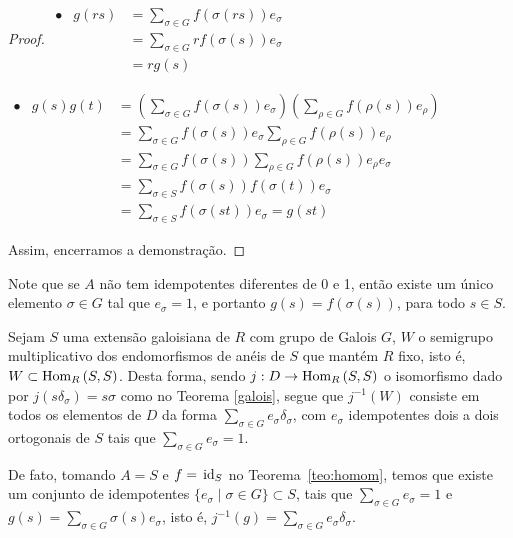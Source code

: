 \begin{teo}
\begin{proof}
\vspace{0.3 cm}

$\begin{array}{rrl}
        \bullet & g(rs) &=\sum_{\sigma \in G} f(\sigma(rs)) e_\sigma \\
        & &= \sum_{\sigma \in G} r f(\sigma(s)) e_\sigma \\
        & &= rg(s)
\end{array}$

\vspace{0.3cm}

$\begin{array}{rrl}
        \bullet & g(s)g(t) &= \left(\sum_{\sigma \in G} f(\sigma(s))e_\sigma \right) \left(\sum_{\rho \in G} f(\rho (s)) e_\rho \right) \\
        & &= \sum_{\sigma \in G} f(\sigma(s))e_\sigma \sum_{\rho \in G} f(\rho (s)) e_\rho \\
        & &= \sum_{\sigma \in G} f(\sigma(s)) \sum_{\rho \in G} f(\rho (s)) e_\rho e_\sigma \\
        & &= \sum_{\sigma \in S} f(\sigma(s)) f(\sigma(t)) e_\sigma \\
        & &= \sum_{\sigma \in S}f(\sigma(st))e_\sigma = g(st) 
\end{array}$
\vspace{0.3 cm}

Assim, encerramos a demonstração.
\end{proof}
\end{teo}
Note que se $A$ não tem idempotentes diferentes de 0 e 1, então existe um único elemento $\sigma \in G$ tal que $e_\sigma = 1$, e portanto $g(s) = f(\sigma(s))$, para todo $s \in S$.

Sejam $S$ uma extensão galoisiana de $R$ com grupo de Galois $G$, $W$ o semigrupo multiplicativo dos endomorfismos de anéis de $S$ que mantém $R$ fixo, isto é, $W\subset \textrm{Hom}_{R}\left( S,S \right)$. Desta forma, sendo $j: D \rightarrow \textrm{Hom}_{R}\left( S,S \right)$ o isomorfismo dado por $j(s\delta_\sigma) = s\sigma$ como no Teorema \ref{galois}, segue que $j^{-1}(W)$ consiste em todos os elementos de $D$ da forma $\sum_{\sigma \in G}e_\sigma \delta_\sigma$, com $e_\sigma$ idempotentes dois a dois ortogonais de $S$ tais que $\sum_{\sigma \in G} e_\sigma = 1$.

De fato, tomando $A=S$ e $f=\, \textrm{id}_{S}$ no Teorema~\ref{teo:homom}, temos que existe um conjunto de idempotentes $\{e_\sigma \mid \sigma \in G\}\subset S$, tais que $\sum_{\sigma \in G}e_\sigma = 1$ e $g(s)=\sum_{\sigma \in G} \sigma(s) e_\sigma$, isto é, $j^{-1}(g)=\sum_{\sigma \in G}e_\sigma \delta_\sigma$.

